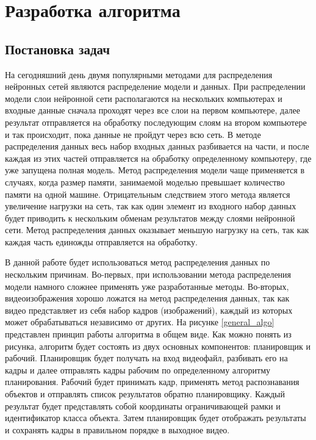 \section{Разработка алгоритма}

\subsection{Постановка задач}

На сегодняшний день двумя популярными методами для распределения нейронных сетей являются распределение модели и данных.
При распределении модели слои нейронной сети располагаются на нескольких компьютерах и входные данные сначала проходят 
через все слои на первом компьютере, далее результат отправляется на обработку последующим слоям на втором компьютере 
и так происходит, пока данные не пройдут через всю сеть. В методе распределения данных весь набор входных данных разбивается 
на части, и после каждая из этих частей отправляется на обработку определенному компьютеру, где уже запущена полная модель.
Метод распределения модели чаще применяется в случаях, когда размер памяти, занимаемой моделью превышает количество памяти 
на одной машине. Отрицательным следствием этого метода является увеличение нагрузки на сеть, так как один элемент из входного 
набор данных будет приводить к нескольким обменам результатов между слоями нейронной сети. Метод распределения данных 
оказывает меньшую нагрузку на сеть, так как каждая часть единожды отправляется на обработку. 

В данной работе будет использоваться метод распределения данных по нескольким причинам. Во-первых, при использовании метода 
распределения модели намного сложнее применять уже разработанные методы. Во-вторых, видеоизображения хорошо ложатся на метод 
распределения данных, так как видео представляет из себя набор кадров (изображений), каждый из которых может обрабатываться 
независимо от других. На рисунке \ref{general_algo} представлен принцип работы алгоритма в общем виде. Как можно понять из 
рисунка, алгоритм будет состоять из двух основных компонентов: планировщик и рабочий. Планировщик будет получать на вход 
видеофайл, разбивать его на кадры и далее отправлять кадры рабочим по определенному алгоритму планирования. Рабочий будет 
принимать кадр, применять метод распознавания объектов и отправлять список результатов обратно планировщику. Каждый 
результат будет представлять собой координаты ограничивающей рамки и идентификатор класса объекта. Затем планировщик будет 
отображать результаты и сохранять кадры в правильном порядке в выходное видео. 

